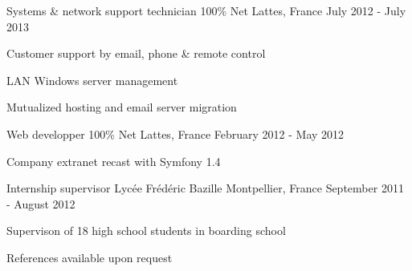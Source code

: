 \begin{cventries}
  \cventry
    {Systems \& network support technician} %
    {100\% Net} %
    {Lattes, France} %
    {July 2012 - July 2013} %
    {
      \begin{cvitems} %
        \item {Customer support by email, phone \& remote control}
        \item {LAN Windows server management}
        \item {Mutualized hosting and email server migration}
      \end{cvitems}
    }

  \cventry
    {Web developper} %
    {100\% Net} %
    {Lattes, France} %
    {February 2012 - May 2012} %
    {
      \begin{cvitems} %
        \item {Company extranet recast with Symfony 1.4}
      \end{cvitems}
    }
  
  \cventry
    {Internship supervisor} %
    {Lycée Frédéric Bazille} %
    {Montpellier, France} %
    {September 2011 - August 2012} %
    {
      \begin{cvitems} %
        \item {Supervison of 18 high school students in boarding school}
      \end{cvitems}
    }
  
  \cventry
    {} %
    {} %
    {} %
    {} %
    {References available upon request}
  
  \end{cventries}
